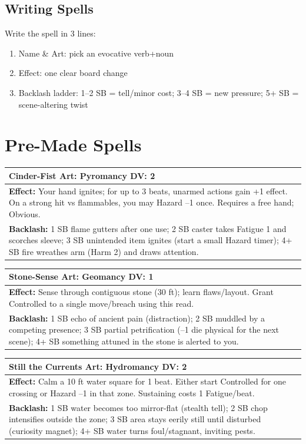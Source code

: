 \documentclass[11pt]{report}
\newenvironment{spellentry}[3]{%
  \begin{center}
    \begin{tabular}{|p{5.5in}|}
      \hline
      \textbf{#1} \hfill \textbf{Art:} #2 \hfill \textbf{DV:} #3 \\
      \hline
}{%
      \hline
    \end{tabular}
  \end{center}
}
\begin{document}
\subsection{Writing Spells}
Write the spell in 3 lines:
\begin{enumerate}
    \item Name \& Art: pick an evocative verb+noun
    \item Effect: one clear board change
    \item Backlash ladder: 1--2 SB = tell/minor cost; 3--4 SB = new pressure; 5+ SB = scene-altering twist
\end{enumerate}

\section{Pre-Made Spells}

\begin{spellentry}{Cinder-Fist}{Pyromancy}{2}
\textbf{Effect:} Your hand ignites; for up to 3 beats, unarmed actions gain +1 effect. On a strong hit vs flammables, you may Hazard --1 once. Requires a free hand; Obvious.\\
\textbf{Backlash:} 1 SB flame gutters after one use; 2 SB caster takes Fatigue 1 and scorches sleeve; 3 SB unintended item ignites (start a small Hazard timer); 4+ SB fire wreathes arm (Harm 2) and draws attention.
\end{spellentry}

\begin{spellentry}{Stone-Sense}{Geomancy}{1}
\textbf{Effect:} Sense through contiguous stone (30 ft); learn flaws/layout. Grant Controlled to a single move/breach using this read.\\
\textbf{Backlash:} 1 SB echo of ancient pain (distraction); 2 SB muddled by a competing presence; 3 SB partial petrification (--1 die physical for the next scene); 4+ SB something attuned in the stone is alerted to you.
\end{spellentry}

\begin{spellentry}{Still the Currents}{Hydromancy}{2}
\textbf{Effect:} Calm a 10 ft water square for 1 beat. Either start Controlled for one crossing or Hazard --1 in that zone. Sustaining costs 1 Fatigue/beat.\\
\textbf{Backlash:} 1 SB water becomes too mirror-flat (stealth tell); 2 SB chop intensifies outside the zone; 3 SB area stays eerily still until disturbed (curiosity magnet); 4+ SB water turns foul/stagnant, inviting pests.
\end{spellentry}
\end{document}
